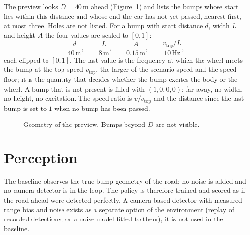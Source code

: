 \documentclass[11pt]{article}
\begin{document}
The preview looks $D = 40$\,m ahead (Figure~\ref{fig:preview}) and lists the bumps whose start lies within this distance and whose end the car has not yet passed, nearest first, at most three. Holes are not listed. For a bump with start distance $d$, width $L$ and height $A$ the four values are scaled to $[0,1]$:
\begin{equation}
\frac{d}{40\,\mathrm{m}}, \qquad \frac{L}{8\,\mathrm{m}}, \qquad \frac{A}{0.15\,\mathrm{m}}, \qquad \frac{v_{\mathrm{top}}/L}{10\ \mathrm{Hz}},
\end{equation}
each clipped to $[0,1]$. The last value is the frequency at which the wheel meets the bump at the top speed $v_{\mathrm{top}}$, the larger of the scenario speed and the speed floor; it is the quantity that decides whether the bump excites the body or the wheel. A bump that is not present is filled with $(1,0,0,0)$: far away, no width, no height, no excitation. The speed ratio is $v/v_{\mathrm{top}}$ and the distance since the last bump is set to $1$ when no bump has been passed.

\begin{figure}[h]
\centering
{}
\caption{Geometry of the preview. Bumps beyond $D$ are not visible.}\label{fig:preview}
\end{figure}

\section{Perception}

The baseline observes the true bump geometry of the road: no noise is added and no camera detector is in the loop. The policy is therefore trained and scored as if the road ahead were detected perfectly. A camera-based detector with measured range bias and noise exists as a separate option of the environment (replay of recorded detections, or a noise model fitted to them); it is not used in the baseline.
\end{document}
